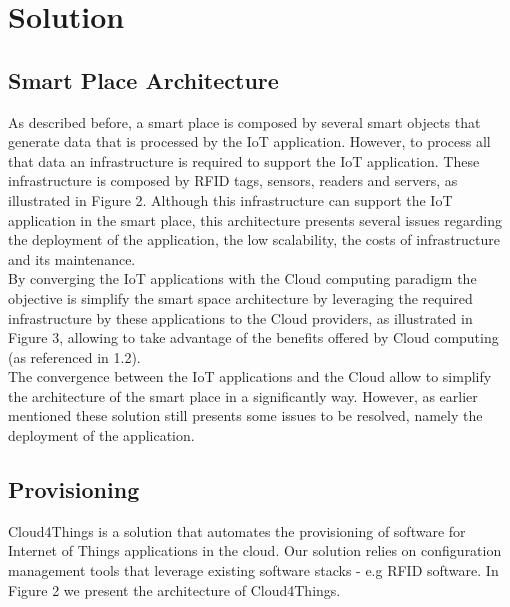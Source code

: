 
\chapter{Solution}
\label{chapter:solution}

\section{Smart Place Architecture}
\label{sec:smart_place_architecture}
As described before, a smart place is composed by several smart objects that generate data that is
processed by the IoT application. However, to process all that data an infrastructure is required to
support the IoT application. These infrastructure is composed by RFID tags, sensors, readers and
servers, as illustrated in Figure 2. Although this infrastructure can support the IoT application
in the smart place, this architecture presents several issues regarding the deployment of the
application, the low scalability, the costs of infrastructure and its maintenance.\\

By converging the IoT applications with the Cloud computing paradigm the objective is simplify the
smart space architecture by leveraging the required infrastructure by these applications to the
Cloud providers, as illustrated in Figure 3, allowing to take advantage of the benefits offered by
Cloud computing (as referenced in 1.2).\\

The convergence between the IoT applications and the Cloud allow to simplify the architecture of the
smart place in a significantly way. However, as earlier mentioned these solution still presents some
issues to be resolved, namely the deployment of the application.

\section{Provisioning}
\label{sec:provisioning}
Cloud4Things is a solution that automates the provisioning of software for Internet of Things applications
in the cloud. Our solution relies on configuration management tools that leverage existing software
stacks - e.g RFID software. In Figure 2 we present the architecture of Cloud4Things.\\

